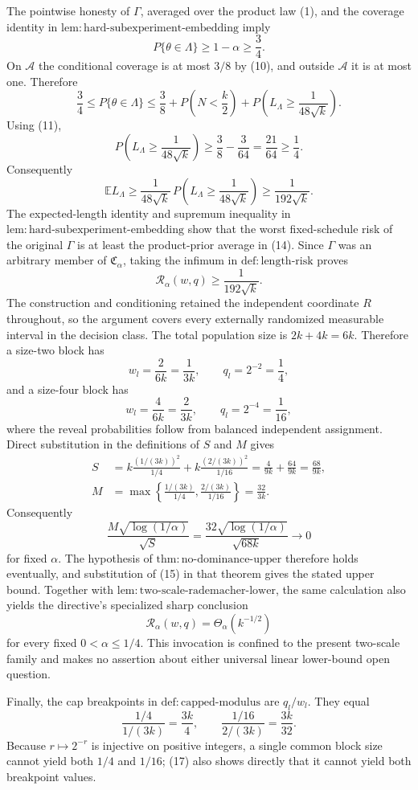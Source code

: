 The pointwise honesty of \(\Gamma\), averaged over the product law
(1), and the coverage identity in
\(\mathrm{lem{:}hard\text{-}subexperiment\text{-}embedding}\) imply
\[
 P\{\theta\in\Lambda\}\ge1-\alpha\ge\frac34.
\tag{12}
\]
On \(\mathcal A\) the conditional coverage is at most \(3/8\) by
(10), and outside \(\mathcal A\) it is at most one.  Therefore
\[
 \frac34
 \le P\{\theta\in\Lambda\}
 \le\frac38+P\left(N<\frac k2\right)
      +P\left(L_\Lambda\ge\frac1{48\sqrt{k}}\right).
\]
Using (11),
\[
 P\left(L_\Lambda\ge\frac1{48\sqrt{k}}\right)
 \ge\frac38-\frac3{64}=\frac{21}{64}\ge\frac14.
\tag{13}
\]
Consequently
\[
 \mathbb E L_\Lambda
 \ge\frac1{48\sqrt{k}}\,
     P\left(L_\Lambda\ge\frac1{48\sqrt{k}}\right)
 \ge\frac1{192\sqrt{k}}.
\tag{14}
\]
The expected-length identity and supremum inequality in
\(\mathrm{lem{:}hard\text{-}subexperiment\text{-}embedding}\) show
that the worst fixed-schedule risk of the original \(\Gamma\) is at
least the product-prior average in (14).  Since \(\Gamma\) was an
arbitrary member of \(\mathfrak C_\alpha\), taking the infimum in
\(\mathrm{def{:}length\text{-}risk}\) proves
\[
 \mathcal R_\alpha(w,q)\ge\frac1{192\sqrt{k}}.
\]
The construction and conditioning retained the independent coordinate
\(R\) throughout, so the argument covers every externally randomized
measurable interval in the decision class.
The total population size is \(2k+4k=6k\).  Therefore a size-two
block has
\[
 w_l=\frac2{6k}=\frac1{3k},\qquad q_l=2^{-2}=\frac14,
\]
and a size-four block has
\[
 w_l=\frac4{6k}=\frac2{3k},\qquad q_l=2^{-4}=\frac1{16},
\]
where the reveal probabilities follow from balanced independent
assignment.  Direct substitution in the definitions of \(S\) and
\(M\) gives
\[
\begin{aligned}
 S
 &=k\frac{(1/(3k))^2}{1/4}
   +k\frac{(2/(3k))^2}{1/16}
   =\frac4{9k}+\frac{64}{9k}
   =\frac{68}{9k},\\
 M
 &=\max\left\{\frac{1/(3k)}{1/4},
                \frac{2/(3k)}{1/16}\right\}
   =\frac{32}{3k}.
\end{aligned}
\tag{15}
\]
Consequently
\[
 \frac{M\sqrt{\log(1/\alpha)}}{\sqrt S}
 =\frac{32\sqrt{\log(1/\alpha)}}{\sqrt{68k}}
 \longrightarrow0
\tag{16}
\]
for fixed \(\alpha\).  The hypothesis of
\(\mathrm{thm{:}no\text{-}dominance\text{-}upper}\) therefore holds
eventually, and substitution of (15) in that theorem gives the stated
upper bound.  Together with
\(\mathrm{lem{:}two\text{-}scale\text{-}rademacher\text{-}lower}\),
the same calculation also yields the directive's specialized sharp
conclusion
\[
 \mathcal R_\alpha(w,q)=\Theta_\alpha(k^{-1/2})
\]
for every fixed \(0<\alpha\le1/4\).  This invocation is confined to
the present two-scale family and makes no assertion about either
universal linear lower-bound open question.

Finally, the cap breakpoints in
\(\mathrm{def{:}capped\text{-}modulus}\) are \(q_l/w_l\).  They equal
\[
 \frac{1/4}{1/(3k)}=\frac{3k}{4},
 \qquad
 \frac{1/16}{2/(3k)}=\frac{3k}{32}.
\tag{17}
\]
Because \(r\mapsto2^{-r}\) is injective on positive integers, a
single common block size cannot yield both \(1/4\) and \(1/16\); (17)
also shows directly that it cannot yield both breakpoint values.
